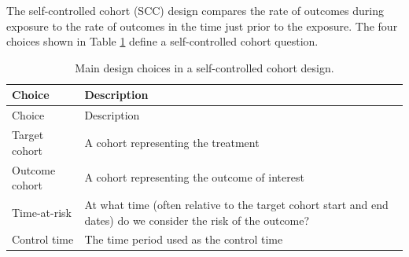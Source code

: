 \documentclass[]{book}
\begin{document}
The self-controlled cohort (SCC) design \citep{ryan_2013} compares the rate of outcomes during exposure to the rate of outcomes in the time just prior to the exposure. The four choices shown in Table \ref{tab:sccChoices} define a self-controlled cohort question.  

\begin{longtable}[]{@{}ll@{}}
\caption{\label{tab:sccChoices} Main design choices in a self-controlled cohort design.}\tabularnewline
\toprule
\begin{minipage}[b]{0.23\columnwidth}\raggedright
Choice\strut
\end{minipage} & \begin{minipage}[b]{0.72\columnwidth}\raggedright
Description\strut
\end{minipage}\tabularnewline
\midrule
\endfirsthead
\toprule
\begin{minipage}[b]{0.23\columnwidth}\raggedright
Choice\strut
\end{minipage} & \begin{minipage}[b]{0.72\columnwidth}\raggedright
Description\strut
\end{minipage}\tabularnewline
\midrule
\endhead
\begin{minipage}[t]{0.23\columnwidth}\raggedright
Target cohort\strut
\end{minipage} & \begin{minipage}[t]{0.72\columnwidth}\raggedright
A cohort representing the treatment\strut
\end{minipage}\tabularnewline
\begin{minipage}[t]{0.23\columnwidth}\raggedright
Outcome cohort\strut
\end{minipage} & \begin{minipage}[t]{0.72\columnwidth}\raggedright
A cohort representing the outcome of interest\strut
\end{minipage}\tabularnewline
\begin{minipage}[t]{0.23\columnwidth}\raggedright
Time-at-risk\strut
\end{minipage} & \begin{minipage}[t]{0.72\columnwidth}\raggedright
At what time (often relative to the target cohort start and end dates) do we consider the risk of the outcome?\strut
\end{minipage}\tabularnewline
\begin{minipage}[t]{0.23\columnwidth}\raggedright
Control time\strut
\end{minipage} & \begin{minipage}[t]{0.72\columnwidth}\raggedright
The time period used as the control time\strut
\end{minipage}\tabularnewline
\bottomrule
\end{longtable}
\end{document}
